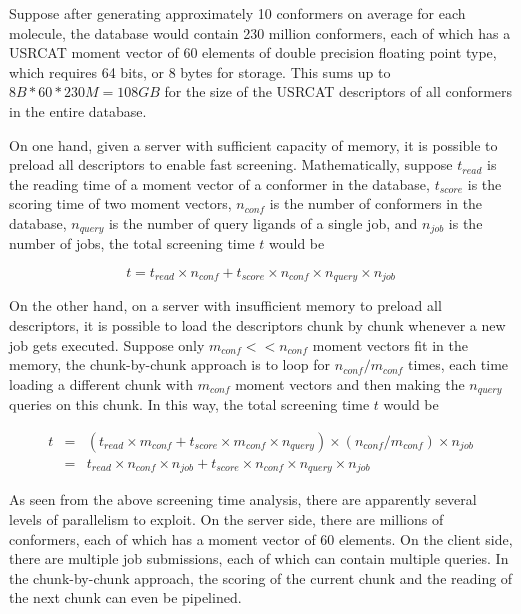 Suppose after generating approximately 10 conformers on average for each molecule, the database would contain 230 million conformers, each of which has a USRCAT moment vector of 60 elements of double precision floating point type, which requires 64 bits, or 8 bytes for storage. This sums up to $8B*60*230M=108GB$ for the size of the USRCAT descriptors of all conformers in the entire database.

On one hand, given a server with sufficient capacity of memory, it is possible to preload all descriptors to enable fast screening. Mathematically, suppose $t_{read}$ is the reading time of a moment vector of a conformer in the database, $t_{score}$ is the scoring time of two moment vectors, $n_{conf}$ is the number of conformers in the database, $n_{query}$ is the number of query ligands of a single job, and $n_{job}$ is the number of jobs, the total screening time $t$ would be

\begin{equation}
t=t_{read}\times n_{conf}+t_{score}\times n_{conf}\times n_{query}\times n_{job}
\label{usr:time0}
\end{equation}

On the other hand, on a server with insufficient memory to preload all descriptors, it is possible to load the descriptors chunk by chunk whenever a new job gets executed. Suppose only $m_{conf} << n_{conf}$ moment vectors fit in the memory, the chunk-by-chunk approach is to loop for $n_{conf}/m_{conf}$ times, each time loading a different chunk with $m_{conf}$ moment vectors and then making the $n_{query}$ queries on this chunk. In this way, the total screening time $t$ would be

\begin{eqnarray}
t&=&(t_{read}\times m_{conf}+t_{score}\times m_{conf}\times n_{query})\times(n_{conf}/m_{conf})\times n_{job}\nonumber\\
 &=&t_{read}\times n_{conf}\times n_{job}+t_{score}\times n_{conf}\times n_{query}\times n_{job}
\label{usr:time1}
\end{eqnarray}

As seen from the above screening time analysis, there are apparently several levels of parallelism to exploit. On the server side, there are millions of conformers, each of which has a moment vector of 60 elements. On the client side, there are multiple job submissions, each of which can contain multiple queries. In the chunk-by-chunk approach, the scoring of the current chunk and the reading of the next chunk can even be pipelined.

